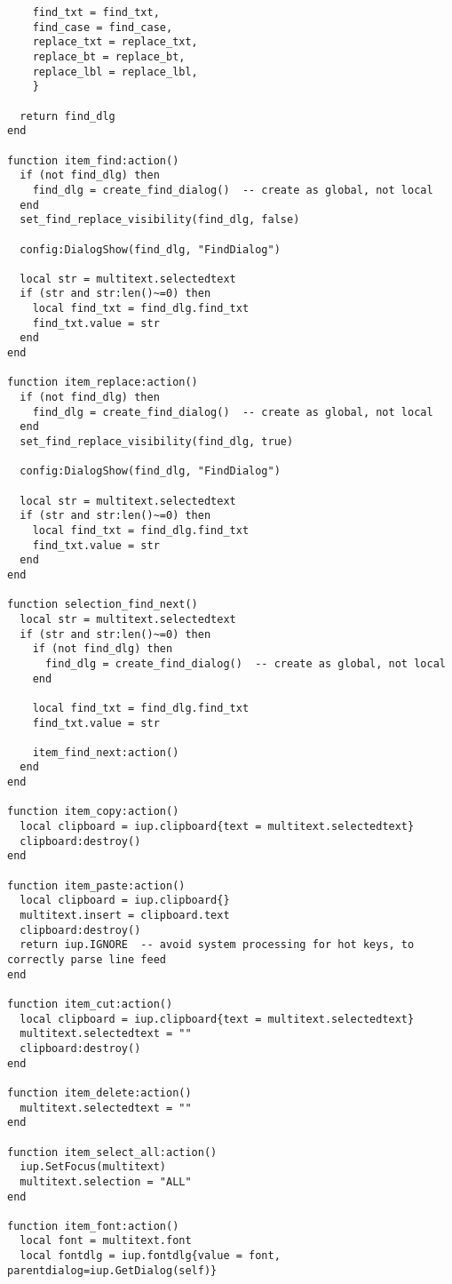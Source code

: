 \documentclass{ctexart}
\begin{document}
\begin{lstlisting}
    find_txt = find_txt,
    find_case = find_case,
    replace_txt = replace_txt,
    replace_bt = replace_bt, 
    replace_lbl = replace_lbl,
    }

  return find_dlg
end

function item_find:action()
  if (not find_dlg) then
    find_dlg = create_find_dialog()  -- create as global, not local
  end
  set_find_replace_visibility(find_dlg, false)

  config:DialogShow(find_dlg, "FindDialog")

  local str = multitext.selectedtext
  if (str and str:len()~=0) then
    local find_txt = find_dlg.find_txt
    find_txt.value = str
  end
end

function item_replace:action()
  if (not find_dlg) then
    find_dlg = create_find_dialog()  -- create as global, not local
  end
  set_find_replace_visibility(find_dlg, true)

  config:DialogShow(find_dlg, "FindDialog")

  local str = multitext.selectedtext
  if (str and str:len()~=0) then
    local find_txt = find_dlg.find_txt
    find_txt.value = str
  end
end

function selection_find_next()
  local str = multitext.selectedtext
  if (str and str:len()~=0) then
    if (not find_dlg) then
      find_dlg = create_find_dialog()  -- create as global, not local
    end

    local find_txt = find_dlg.find_txt
    find_txt.value = str

    item_find_next:action()
  end
end

function item_copy:action()
  local clipboard = iup.clipboard{text = multitext.selectedtext}
  clipboard:destroy()
end

function item_paste:action()
  local clipboard = iup.clipboard{}
  multitext.insert = clipboard.text
  clipboard:destroy()
  return iup.IGNORE  -- avoid system processing for hot keys, to correctly parse line feed
end

function item_cut:action()
  local clipboard = iup.clipboard{text = multitext.selectedtext}
  multitext.selectedtext = ""
  clipboard:destroy()
end

function item_delete:action()
  multitext.selectedtext = ""
end

function item_select_all:action()
  iup.SetFocus(multitext)
  multitext.selection = "ALL"
end

function item_font:action()
  local font = multitext.font
  local fontdlg = iup.fontdlg{value = font, parentdialog=iup.GetDialog(self)}


\end{lstlisting}
\end{document}

